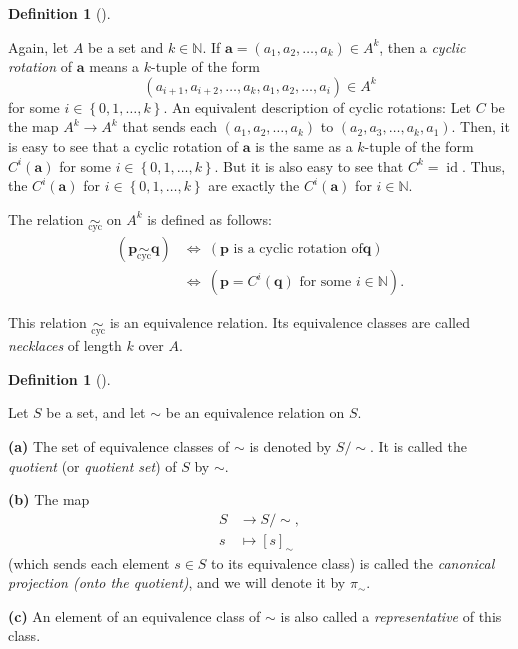 \documentclass[numbers=enddot,12pt,final,onecolumn,notitlepage]{scrartcl}%
\numberwithin{exer}{subsection}
\theoremstyle{definition}
\newtheorem{defi}[theo]{Definition}
\newenvironment{definition}[1][]
{\begin{defi}[#1]\begin{leftbar}}
{\end{leftbar}\end{defi}}
\begin{document}
\begin{definition}
Again, let $A$ be a set and $k\in\mathbb{N}$. If $\mathbf{a}=\left(
a_{1},a_{2},\ldots,a_{k}\right)  \in A^{k}$, then a \textit{cyclic rotation}
of $\mathbf{a}$ means a $k$-tuple of the form%
\[
\left(  a_{i+1},a_{i+2},\ldots,a_{k},a_{1},a_{2},\ldots,a_{i}\right)  \in
A^{k}%
\]
for some $i\in\left\{  0,1,\ldots,k\right\}  $. An equivalent description of
cyclic rotations: Let $C$ be the map $A^{k}\rightarrow A^{k}$ that sends each
$\left(  a_{1},a_{2},\ldots,a_{k}\right)  $ to $\left(  a_{2},a_{3}%
,\ldots,a_{k},a_{1}\right)  $. Then, it is easy to see that a cyclic rotation
of $\mathbf{a}$ is the same as a $k$-tuple of the form $C^{i}\left(
\mathbf{a}\right)  $ for some $i\in\left\{  0,1,\ldots,k\right\}  $. But it is
also easy to see that $C^{k}=\operatorname*{id}$. Thus, the $C^{i}\left(
\mathbf{a}\right)  $ for $i\in\left\{  0,1,\ldots,k\right\}  $ are exactly the
$C^{i}\left(  \mathbf{a}\right)  $ for $i\in\mathbb{N}$.

The relation $\underset{\operatorname*{cyc}}{\sim}$ on $A^{k}$ is defined as
follows:%
\begin{align*}
\left(  \mathbf{p}\underset{\operatorname*{cyc}}{\sim}\mathbf{q}\right)   &
\Longleftrightarrow\ \left(  \mathbf{p}\text{ is a cyclic rotation of
}\mathbf{q}\right) \\
&  \Longleftrightarrow\ \left(  \mathbf{p}=C^{i}\left(  \mathbf{q}\right)
\text{ for some }i\in\mathbb{N}\right)  .
\end{align*}


This relation $\underset{\operatorname*{cyc}}{\sim}$ is an equivalence
relation. Its equivalence classes are called \textit{necklaces} of length $k$
over $A$.
\end{definition}

\begin{definition}
Let $S$ be a set, and let $\sim$ be an equivalence relation on $S$.

\textbf{(a)} The set of equivalence classes of $\sim$ is denoted by $S/\sim$.
It is called the \textit{quotient} (or \textit{quotient set}) of $S$ by $\sim$.

\textbf{(b)} The map%
\begin{align*}
S  &  \rightarrow S/\sim,\\
s  &  \mapsto\left[  s\right]  _{\sim}%
\end{align*}
(which sends each element $s\in S$ to its equivalence class) is called the
\textit{canonical projection (onto the quotient)}, and we will denote it by
$\pi_{\sim}$.

\textbf{(c)} An element of an equivalence class of $\sim$ is also called a
\textit{representative} of this class.
\end{definition}
\end{document}
